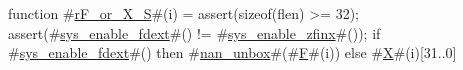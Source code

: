 function #\hyperref[sailRISCVzrFzyorzyXzyS]{rF\_or\_X\_S}#(i) = {
  assert(sizeof(flen) >= 32);
  assert(#\hyperref[sailRISCVzsyszyenablezyfdext]{sys\_enable\_fdext}#() != #\hyperref[sailRISCVzsyszyenablezyzzfinx]{sys\_enable\_zfinx}#());
  if   #\hyperref[sailRISCVzsyszyenablezyfdext]{sys\_enable\_fdext}#()
  then #\hyperref[sailRISCVznanzyunbox]{nan\_unbox}#(#\hyperref[sailRISCVzF]{F}#(i))
  else #\hyperref[sailRISCVzX]{X}#(i)[31..0]
}
